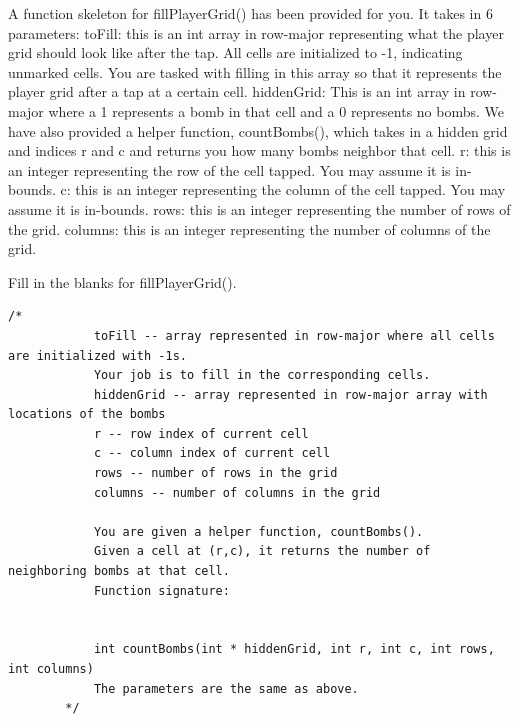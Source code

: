 \documentclass{article}
\begin{document}
\begin{enumerate}[label=(\alph*)]
\begin{itemize}
    A function skeleton for fillPlayerGrid() has been provided for you. It takes in 6 parameters: \newline \newline
    toFill: this is an int array in row-major representing what the player grid should look like after the tap. All cells are initialized to -1, indicating unmarked cells. You are tasked with filling in this array so that it represents the player grid after a tap at a certain cell. \newline \newline
    hiddenGrid: This is an int array in row-major where a 1 represents a bomb in that cell and a 0 represents no bombs. 
    We have also provided a helper function, countBombs(), which takes in a hidden grid and indices r and c and returns you how many bombs neighbor that cell.  \newline \newline
    r: this is an integer representing the row of the cell tapped. You may assume it is in-bounds. \newline \newline
    c: this is an integer representing the column of the cell tapped. You may assume it is in-bounds.\newline \newline
    rows: this is an integer representing the number of rows of the grid. \newline \newline
    columns: this is an integer representing the number of columns of the grid.
    
    Fill in the blanks for fillPlayerGrid().

    \begin{lstlisting}[style=CStyle]
        /*
            toFill -- array represented in row-major where all cells are initialized with -1s. 
            Your job is to fill in the corresponding cells.
            hiddenGrid -- array represented in row-major array with locations of the bombs
            r -- row index of current cell
            c -- column index of current cell
            rows -- number of rows in the grid
            columns -- number of columns in the grid
    
            You are given a helper function, countBombs(). 
            Given a cell at (r,c), it returns the number of neighboring bombs at that cell.
            Function signature:


            int countBombs(int * hiddenGrid, int r, int c, int rows, int columns)
            The parameters are the same as above.
        */


\end{lstlisting}
\end{itemize}
\end{enumerate}
\end{document}
